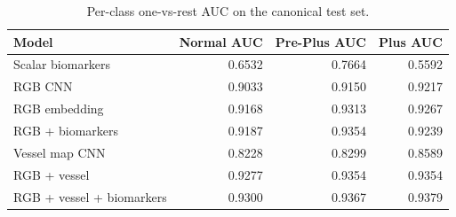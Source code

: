 \begin{table}[htbp]
\centering
\small
\caption{Per-class one-vs-rest AUC on the canonical test set.}
\label{tab:perclass}
\begin{tabular}{lrrr}
\toprule
Model & Normal AUC & Pre-Plus AUC & Plus AUC \\
\midrule
Scalar biomarkers & 0.6532 & 0.7664 & 0.5592 \\
RGB CNN & 0.9033 & 0.9150 & 0.9217 \\
RGB embedding & 0.9168 & 0.9313 & 0.9267 \\
RGB + biomarkers & 0.9187 & 0.9354 & 0.9239 \\
Vessel map CNN & 0.8228 & 0.8299 & 0.8589 \\
RGB + vessel & 0.9277 & 0.9354 & 0.9354 \\
RGB + vessel + biomarkers & 0.9300 & 0.9367 & 0.9379 \\
\bottomrule
\end{tabular}
\end{table}

